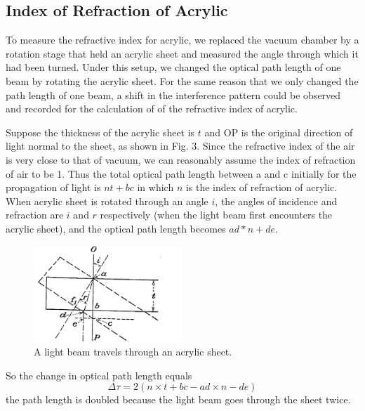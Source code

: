 \documentclass{article}
\begin{document}
\subsection{Index of Refraction of Acrylic}
To measure the refractive index for acrylic, we replaced the vacuum chamber by a rotation stage that held an acrylic sheet and measured the angle through which it had been turned. Under this setup, we changed the optical path length of one beam by rotating the acrylic sheet. For the same reason that we only changed the path length of one beam, a shift in the interference pattern could be observed and recorded for the calculation of of the refractive index of acrylic. 

Suppose the thickness of the acrylic sheet is $t$ and OP is the original direction of light normal to the sheet, as shown in Fig. 3. Since the refractive index of the air is very close to that of vacuum, we can reasonably assume the index of refraction of air to be 1. Thus the total optical path length between a and c initially for the propagation of light is $nt+bc$ in which $n$ is the index of refraction of acrylic. When acrylic sheet is rotated through an angle $i$, the angles of incidence and refraction are $i$ and $r$ respectively (when the light beam first encounters the acrylic sheet), and the optical path length becomes $ad*n+de$.

\begin{figure}[htb]
	\begin{center}
		\includegraphics[width=0.5\textwidth]{picture4} %
		\caption{A light beam travels through an acrylic sheet.}
	\end{center}
\end{figure}

So the change in optical path length equals
\begin{equation}
	\Delta{\tau}=2(n\times{t}+bc-ad\times{n}-de)
\end{equation}
the path length is doubled because the light beam goes through the sheet twice.
\end{document}
